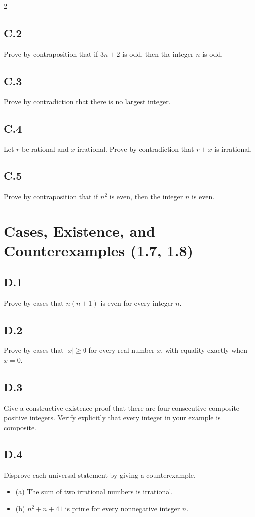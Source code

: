 \documentclass{article}
\begin{document}
\begin{multicols}{2}
\subsection*{C.2}
Prove by contraposition that if $3n+2$ is odd, then the integer $n$ is odd.

\subsection*{C.3}
Prove by contradiction that there is no largest integer.

\subsection*{C.4}
Let $r$ be rational and $x$ irrational. Prove by contradiction that $r+x$ is irrational.

\subsection*{C.5}
Prove by contraposition that if $n^2$ is even, then the integer $n$ is even.

\section*{Cases, Existence, and Counterexamples (1.7, 1.8)}

\subsection*{D.1}
Prove by cases that $n(n+1)$ is even for every integer $n$.

\subsection*{D.2}
Prove by cases that $|x|\ge 0$ for every real number $x$, with equality exactly when $x=0$.

\subsection*{D.3}
Give a constructive existence proof that there are four consecutive composite
positive integers. Verify explicitly that every integer in your example is
composite.

\subsection*{D.4}
Disprove each universal statement by giving a counterexample.
\begin{itemize}
  \item (a) The sum of two irrational numbers is irrational.
  \item (b) $n^2+n+41$ is prime for every nonnegative integer $n$.
\end{itemize}


\end{multicols}
\end{document}

